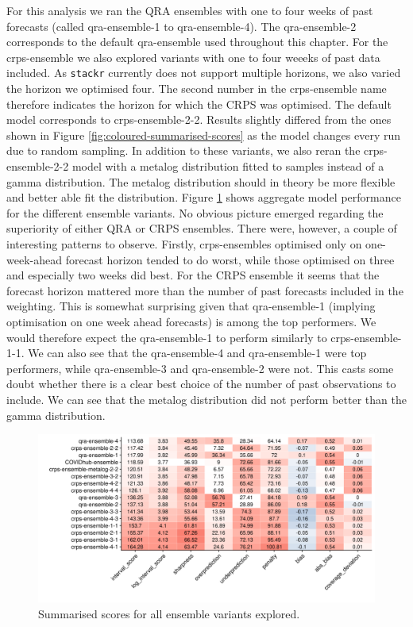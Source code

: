 \documentclass[
]{book}
\begin{document}
For this analysis we ran the QRA ensembles with one to four weeks of past forecasts (called qra-ensemble-1 to qra-ensemble-4). The qra-ensemble-2 corresponds to the default qra-ensemble used throughout this chapter. For the crps-ensemble we also explored variants with one to four weeeks of past data included. As \texttt{stackr} currently does not support multiple horizons, we also varied the horizon we optimised four. The second number in the crps-ensemble name therefore indicates the horizon for which the CRPS was optimised. The default model corresponds to crps-ensemble-2-2. Results slightly differed from the ones shown in Figure \ref{fig:coloured-summarised-scores} as the model changes every run due to random sampling. In addition to these variants, we also reran the crps-ensemble-2-2 model with a metalog distribution \citep{keelinMetalogDistributions2016} fitted to samples instead of a gamma distribution. The metalog distribution should in theory be more flexible and better able fit the distribution. Figure \ref{fig:ensemble-comparison} shows aggregate model performance for the different ensemble variants. No obvious picture emerged regarding the superiority of either QRA or CRPS ensembles. There were, however, a couple of interesting patterns to observe. Firstly, crps-ensembles optimised only on one-week-ahead forecast horizon tended to do worst, while those optimised on three and especially two weeks did best. For the CRPS ensemble it seems that the forecast horizon mattered more than the number of past forecasts included in the weighting. This is somewhat surprising given that qra-ensemble-1 (implying optimisation on one week ahead forecasts) is among the top performers. We would therefore expect the qra-ensemble-1 to perform similarly to crps-ensemble-1-1. We can also see that the qra-ensemble-4 and qra-ensemble-1 were top performers, while qra-ensemble-3 and qra-ensemble-2 were not. This casts some doubt whether there is a clear best choice of the number of past observations to include. We can see that the metalog distribution did not perform better than the gamma distribution.

\begin{figure}
\includegraphics[width=1\linewidth]{../visualisation/chapter-5-results/ensembles/scenario-baseline/coloured-summarised-scores} \caption{Summarised scores for all ensemble variants explored.}\label{fig:ensemble-comparison}
\end{figure}
\end{document}
